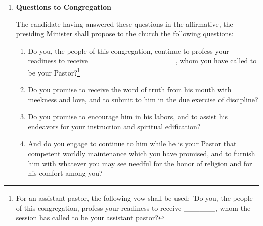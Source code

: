 \documentclass[
]{book}
\providecommand{\tightlist}{%
  \setlength{\itemsep}{0pt}\setlength{\parskip}{0pt}}
\begin{document}
\begin{enumerate}
\def\labelenumi{\arabic{enumi}.}
\setcounter{enumi}{6}
\item
  \textbf{Questions to Congregation}

  The candidate having answered these questions in the affirmative, the presiding Minister shall propose to the church the following questions:

  \begin{enumerate}
  \def\labelenumii{\alph{enumii}.}
  \tightlist
  \item
    Do you, the people of this congregation, continue to profess your readiness to receive \_\_\_\_\_\_\_\_\_\_\_\_\_\_\_\_, whom you have called to be your Pastor?\footnote{For an assistant pastor, the following vow shall be used: 'Do you, the people of this congregation, profess your readiness to receive \_\_\_\_\_\_, whom the session has called to be your assistant pastor?}
  \item
    Do you promise to receive the word of truth from his mouth with meekness and love, and to submit to him in the due exercise of discipline?
  \item
    Do you promise to encourage him in his labors, and to assist his endeavors for your instruction and spiritual edification?
  \item
    And do you engage to continue to him while he is your Pastor that competent worldly maintenance which you have promised, and to furnish him with whatever you may see needful for the honor of religion and for his comfort among you?
  \end{enumerate}
\end{enumerate}
\end{document}
